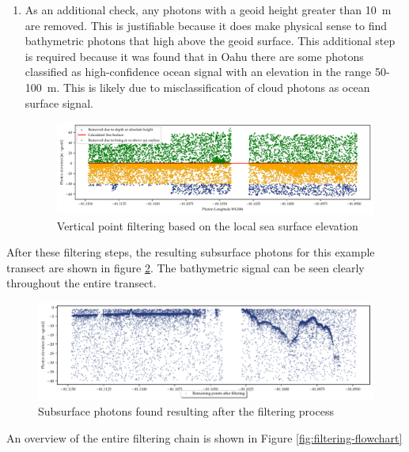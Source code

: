 \begin{enumerate}
    The results of steps 2-4 are shown in figure \ref{fig:vert_filtering}
    
    \item As an additional check, any photons with a geoid height greater than 10~m are removed. This is justifiable because it does make physical sense to find bathymetric photons that high above the geoid surface. This additional step is required because it was found that in Oahu there are some photons classified as high-confidence ocean signal with an elevation in the range 50-100~m. This is likely due to misclassification of cloud photons as ocean surface signal.
    
    
    \begin{figure}[htb]
        \centering
        \includegraphics[width=\textwidth]{figures/methodology_sealvl_filtering.pdf}
        \caption{Vertical point filtering based on the local sea surface elevation}
        \label{fig:vert_filtering}
    \end{figure}
\end{enumerate}

After these filtering steps, the resulting subsurface photons for this example transect are shown in figure \ref{fig:remaing_photons}. The bathymetric signal can be seen clearly throughout the entire transect.

\begin{figure}[htb]
    \centering
    \includegraphics[width=\textwidth]{figures/methodology_reminaing_after_filtering.pdf}
    \caption{Subsurface photons found resulting after the filtering process}
    \label{fig:remaing_photons}
\end{figure}

An overview of the entire filtering chain is shown in Figure \ref{fig:filtering-flowchart} 

